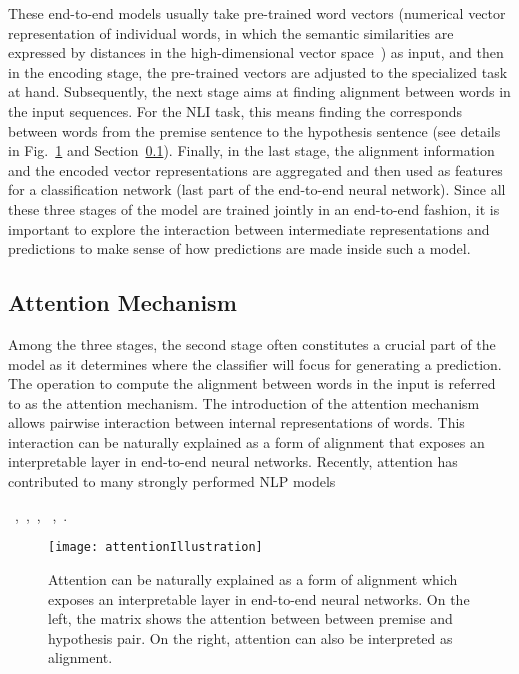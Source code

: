 These end-to-end models usually take pre-trained word vectors (numerical vector representation of individual words, in which the semantic similarities are expressed by distances in the high-dimensional vector space~\cite{MikolovSutskeverChen2013, PenningtonSocherManning2014}) as input, and then in the encoding stage, the pre-trained vectors are adjusted to the specialized task at hand. Subsequently, the next stage aims at finding alignment between words in the input sequences. For the NLI task, this means finding the corresponds between words from the premise sentence to the hypothesis sentence (see details in Fig.~\ref{fig:attention} and Section~\ref{sec:attention}). Finally, in the last stage, the alignment information and the encoded vector representations are aggregated and then used as features for a classification network (last part of the end-to-end neural network).
%
Since all these three stages of the model are trained jointly in an end-to-end fashion, it is important to explore the interaction between intermediate representations and predictions to make sense of how predictions are made inside such a model.

\subsection{Attention Mechanism}
\label{sec:attention}
Among the three stages, the second stage often constitutes a crucial part of the model as it determines where the classifier will focus for generating a prediction. The operation to compute the alignment between words in the input is referred to as the attention mechanism. 
The introduction of the attention mechanism~\cite{bahdanau2014neural} allows
pairwise interaction between internal representations of words. 
This interaction can be naturally explained as a form of alignment that exposes an interpretable layer in end-to-end neural networks.
%
Recently, attention has contributed to many strongly performed NLP models

~\cite{parikh2016emnlp},~\cite{rush2015neural},~\cite{yang2016hierarchical},
~\cite{seo2016bidirectional},~\cite{schwartz2017high}.

\begin{figure}[htbp]
\centering
\vspace{-2mm}
 \texttt{[image: attentionIllustration]}

 \caption{Attention can be naturally explained as a form of alignment which exposes an interpretable layer in end-to-end neural networks. On the left, the matrix shows the attention between between premise and hypothesis pair. On the right, attention can also be interpreted as alignment.}
\label{fig:attention}
\end{figure}

